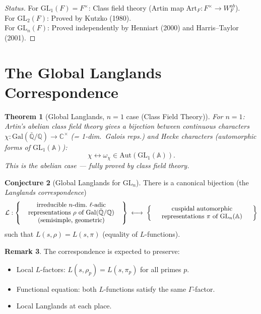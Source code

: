 \documentclass[12pt,a4paper]{amsart}
\newtheorem{theorem}{Theorem}[section]
\theoremstyle{definition}
\newtheorem{remark}[theorem]{Remark}
\newtheorem{conjecture}[theorem]{Conjecture}
\newcommand{\Q}{\mathbb{Q}}
\newcommand{\C}{\mathbb{C}}
\newcommand{\A}{\mathbb{A}}
\newcommand{\GL}{\mathrm{GL}}
\newcommand{\GQ}{\mathrm{Gal}(\bar{\Q}/\Q)}
\newcommand{\Art}{\mathrm{Art}}
\begin{document}
\begin{proof}[Status]
For $\GL_1(F) = F^\times$: Class field theory (Artin map $\Art_F : F^\times \to W_F^{ab}$). \\
For $\mathrm{GL}_2(F)$: Proved by Kutzko (1980). \\
For $\mathrm{GL}_n(F)$: Proved independently by Henniart (2000) and Harris--Taylor (2001).
\end{proof}

\section{The Global Langlands Correspondence}

\begin{theorem}[Global Langlands, $n = 1$ case (Class Field Theory)]
\label{thm:gl1}
For $n = 1$: Artin's abelian class field theory gives a bijection between
continuous characters $\chi : \GQ \to \C^\times$ (= 1-dim.\ Galois reps.)
and Hecke characters (automorphic forms of $\GL_1(\A)$):
\[
  \chi \leftrightarrow \omega_\chi \in \mathrm{Aut}(\GL_1(\A)).
\]
This is the abelian case — fully proved by class field theory.
\end{theorem}

\begin{conjecture}[Global Langlands for $\GL_n$]
\label{conj:global_langlands}
There is a canonical bijection (the \emph{Langlands correspondence})
\[
  \mathcal{L} :
  \left\{\parbox{5.5cm}{\centering irreducible $n$-dim.\ $\ell$-adic representations $\rho$ of $\GQ$
  (semisimple, geometric)}\right\}
  \;\longleftrightarrow\;
  \left\{\parbox{5.5cm}{\centering cuspidal automorphic representations
  $\pi$ of $\GL_n(\mathbb{A})$}\right\}
\]
such that $L(s, \rho) = L(s, \pi)$ (equality of $L$-functions).
\end{conjecture}

\begin{remark}
The correspondence is expected to preserve:
\begin{itemize}
  \item Local $L$-factors: $L(s, \rho_p) = L(s, \pi_p)$ for all primes $p$.
  \item Functional equation: both $L$-functions satisfy the same $\Gamma$-factor.
  \item Local Langlands at each place.
\end{itemize}
\end{remark}
\end{document}

